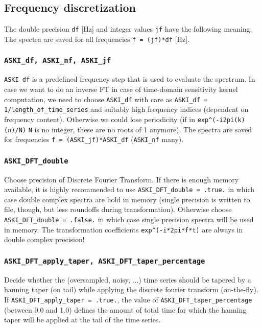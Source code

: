 \documentclass[12pt,a4paper]{article}
\newcommand{\lcode}[1]{\nolinkurl{#1}}
\begin{document}
\subsection{Frequency discretization}
The double precision \lcode{df} [Hz] and integer values \lcode{jf} have the following meaning:
The spectra are saved for all frequencies \lcode{f = (jf)*df} [Hz].
\subsubsection*{\lcode{ASKI_df, ASKI_nf, ASKI_jf}}
\lcode{ASKI_df} is a predefined frequency step that is used to evaluate the spectrum. In case we want to do 
an inverse FT in case of time-domain sensitivity kernel computation, we need to choose \lcode{ASKI_df} with care 
as \lcode{ASKI_df = 1/length_of_time_series} and suitably high frequency indices (dependent on frequency content).
Otherwise we could lose periodicity (if in \lcode{exp^(-i2pi(k)(n)/N)} \lcode{N} is no integer, these are no 
roots of 1 anymore). The spectra are saved for frequencies \lcode{f = (ASKI_jf)*ASKI_df} (\lcode{ASKI_nf} many).
\subsubsection*{\lcode{ASKI_DFT_double}}
Choose precision of Discrete Fourier Transform. If there is enough memory available, it is highly recommended
to use \lcode{ASKI_DFT_double = .true.} in which case double complex spectra are hold in memory (single precision is 
written to file, though, but less roundoffs during transformation). Otherwise choose \lcode{ASKI_DFT_double = .false.}
in which case single precision spectra will be used in memory. The transformation coefficients \lcode{exp^(-i*2pi*f*t)} 
are always in double complex precision!
\subsubsection*{\lcode{ASKI_DFT_apply_taper, ASKI_DFT_taper_percentage}}
Decide whether the (oversampled, noisy, ...) time series should be tapered by a hanning taper (on tail)
while applying the discrete fourier transform (on-the-fly). If \lcode{ASKI_DFT_apply_taper = .true.},
the value of \lcode{ASKI_DFT_taper_percentage} (between 0.0 and 1.0) defines the amount of
total time for which the hanning taper will be applied at the tail of the time series.
\end{document}
